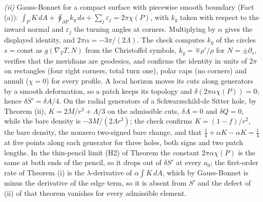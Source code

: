 \emph{(ii)} Gauss-Bonnet for a compact surface with piecewise smooth boundary (Fact (a)): $\int_{P}K\,dA + \oint_{\partial P}k_{g}\,ds + \sum_{j}\varepsilon_{j} = 2\pi\chi(P)$, with $k_{g}$ taken with respect to the inward normal and $\varepsilon_{j}$ the turning angles at corners. Multiplying by $\alpha$ gives the displayed identity, and $2\pi\alpha = -3\pi/(2\Lambda)$. The check computes $k_{g}$ of the circles $s = \mathrm{const}$ as $g(\nabla_{T}T, N)$ from the Christoffel symbols, $k_{g} = \mp\rho'/\rho$ for $N = \pm\partial_{s}$, verifies that the meridians are geodesics, and confirms the identity in units of $2\pi$ on rectangles (four right corners, total turn one), polar caps (no corners) and annuli ($\chi = 0$) for every profile. A local horizon moves its cuts along generators by a smooth deformation, so a patch keeps its topology and $\delta(2\pi\alpha\chi(P)) = 0$; hence $\delta S' = \delta A/4$. On the radial generators of a Schwarzschild-de Sitter hole, by Theorem (ii), $K = 2M/r^{3} + \Lambda/3$ on the admissible cuts, $\delta A = 0$ and $\delta Q = 0$, while the bare density is $-3M/(2\Lambda r^{3})$; the check confirms $K = (1 - f)/r^{2}$, the bare density, the nonzero two-signed bare change, and that $\tfrac14 + \alpha K - \alpha K = \tfrac14$ at five points along each generator for three holes, both signs and two patch lengths. In the thin-pencil limit (H2) of Theorem  the constant $2\pi\alpha\chi(P)$ is the same at both ends of the pencil, so it drops out of $\delta S'$ at every $a_{0}$; the first-order rate of Theorem (i) is the $\lambda$-derivative of $\alpha\int K\,dA$, which by Gauss-Bonnet is minus the derivative of the edge term, so it is absent from $S'$ and the defect of (ii) of that theorem vanishes for every admissible element.

